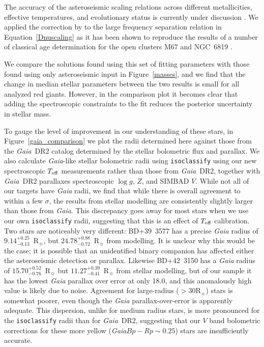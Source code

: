 \documentclass[a4paper,fleqn,usenatbib]{mnras}
\newcommand{\teff}{\mbox{$T_{\rm eff}$}\xspace}
\newcommand{\logg}{\mbox{$\log g$}\xspace}
\newcommand{\rsun}{\mbox{$\mathrm{R}_{\sun}$}\xspace}
\newcommand{\gaia}{\textit{Gaia}\xspace}
\begin{document}
The accuracy of the asteroseismic scaling relations across different metallicities, effective temperatures, and evolutionary status is currently under discussion \citep[see][]{white2011,belkacem2011,sharma2016,viani2017}.
We applied the correction by \cite{Serenelli:2017cn} to the large frequency separation relation in Equation~\ref{Dnuscaling} as it has been shown to reproduce the results of a number of classical age determination for the open clusters M67 \citep{stello2016} and NGC~6819 \citep{casagrande2016}.

We compare the solutions found using this set of fitting parameters with those found using only asteroseismic input in Figure~\ref{masses}, and we find that the change in median stellar parameters between the two results is small for all analyzed red giants. However, in the comparison plot it becomes clear that adding the spectroscopic constraints to the fit reduces the posterior uncertainty in stellar mass.

To gauge the level of improvement in our understanding of these stars, in Figure~\ref{gaia_comparison} we plot the radii determined here against those from the \gaia~DR2 catalog determined by the stellar bolometric flux and parallax.  We also calculate \gaia-like stellar bolometric radii using \texttt{isoclassify} \citep{huber2017} using our new spectroscopic \teff measurements rather than those from \gaia~DR2, together with \gaia~DR2 parallaxes spectroscopic \logg, $Z$, and SIMBAD $V$. While not all of our targets have \gaia radii, we find that while there is overall agreement to within a few $\sigma$, the results from stellar modelling are consistently slightly larger than those from \gaia. This discrepancy goes away for most stars when we use our own \texttt{isoclassify} radii, suggesting that this is an effect of \teff calibration. Two stars are noticeably very different: BD+39~3577 has a precise \gaia radius of $9.14^{+0.25}_{-0.13}$~\rsun, but $24.78^{+0.88}_{-0.72}$~\rsun from modelling. It is unclear why this would be the case; it is possible that an unidentified binary companion has affected either the asteroseismic detection or parallax. Likewise BD+42~3150 has a \gaia radius of $15.70^{+0.52}_{-0.76}$~\rsun but $11.27^{+0.39}_{-0.41}$~\rsun from stellar modelling, but of our sample it has the lowest \gaia parallax over error at only 18.0, and this anomalously high value is likely due to noise. Agreement for large-radius ($>30 \rsun$) stars is somewhat poorer, even though the \gaia parallax-over-error is apparently adequate. This dispersion, unlike for medium radius stars, is more pronounced for the \texttt{isoclassify} radii than for \gaia~DR2, suggesting that our $V$ band bolometric corrections for these more yellow (\gaia $Bp-Rp \sim 0.25$) stars are insufficiently accurate. 
\end{document}
